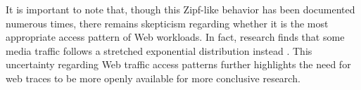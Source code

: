 It is important to note that, though this Zipf-like behavior has been documented numerous times, there remains skepticism regarding whether it is the most appropriate access pattern of Web workloads. In fact, research finds that some media traffic follows a stretched exponential distribution instead \cite{stretched-exponential, internet-zipf}. This uncertainty regarding Web traffic access patterns further highlights the need for web traces to be more openly available for more conclusive research.













